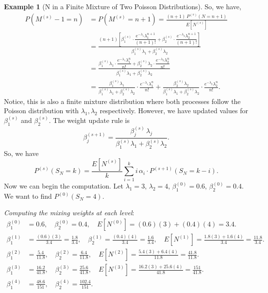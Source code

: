 \documentclass[11pt]{amsart}
\theoremstyle{definition}
\newtheorem{example}{Example}
\theoremstyle{plain}
\begin{document}
\begin{example}[N in a Finite Mixture of Two Poisson Distributions]
So, we have,
\begin{align*}
P(M^{(s)} - 1 = n)
    &= P(M^{(s)} = n + 1)
     = \frac{(n+1)\,P^{(s)}(N = n+1)}{E[N^{(s)}]} \\
    &= \frac{(n+1)\!\left[\beta_1^{(s)} \cdot \dfrac{e^{-\lambda_1}\lambda_1^{n+1}}{(n+1)!}
       + \beta_2^{(s)} \cdot \dfrac{e^{-\lambda_2}\lambda_2^{n+1}}{(n+1)!}\right]}
      {\beta_1^{(s)}\lambda_1 + \beta_2^{(s)}\lambda_2} \\
    &= \frac{\beta_1^{(s)}\lambda_1 \cdot \dfrac{e^{-\lambda_1}\lambda_1^n}{n!}
       + \beta_2^{(s)}\lambda_2 \cdot \dfrac{e^{-\lambda_2}\lambda_2^n}{n!}}
      {\beta_1^{(s)}\lambda_1 + \beta_2^{(s)}\lambda_2} \\
    &= \frac{\beta_1^{(s)}\lambda_1}{\beta_1^{(s)}\lambda_1 + \beta_2^{(s)}\lambda_2}
       \cdot \frac{e^{-\lambda_1}\lambda_1^n}{n!}
     + \frac{\beta_2^{(s)}\lambda_2}{\beta_1^{(s)}\lambda_1 + \beta_2^{(s)}\lambda_2}
       \cdot \frac{e^{-\lambda_2}\lambda_2^n}{n!}.
\end{align*}
Notice, this is also a finite mixture distribution where both processes follow the Poisson
distribution with $\lambda_1, \lambda_2$ respectively.  However, we have updated values for
$\beta_1^{(s)}$ and $\beta_2^{(s)}$.  The weight update rule is
\[
    \beta_j^{(s+1)}
    = \frac{\beta_j^{(s)}\,\lambda_j}{\beta_1^{(s)}\lambda_1 + \beta_2^{(s)}\lambda_2}.
\]
So, we have
\[
    P^{(s)}(S_N = k)
    = \frac{E[N^{(s)}]}{k} \sum_{i=1}^{k} i\,\alpha_i \cdot P^{(s+1)}(S_N = k - i).
\]
Now we can begin the computation.  Let $\lambda_1 = 3$, $\lambda_2 = 4$,
$\beta_1^{(0)} = 0.6$, $\beta_2^{(0)} = 0.4$.  We want to find $P^{(0)}(S_N = 4)$.

\medskip
\noindent\textit{Computing the mixing weights at each level}:
\begin{align*}
\beta_1^{(0)} &= 0.6, \quad \beta_2^{(0)} = 0.4, \quad
E[N^{(0)}] = (0.6)(3) + (0.4)(4) = 3.4. \\
\beta_1^{(1)} &= \frac{(0.6)(3)}{3.4} = \frac{1.8}{3.4}, \quad
\beta_2^{(1)} = \frac{(0.4)(4)}{3.4} = \frac{1.6}{3.4}, \quad
E[N^{(1)}] = \frac{1.8(3) + 1.6(4)}{3.4} = \frac{11.8}{3.4}. \\
\beta_1^{(2)} &= \frac{5.4}{11.8}, \quad \beta_2^{(2)} = \frac{6.4}{11.8}, \quad
E[N^{(2)}] = \frac{5.4(3) + 6.4(4)}{11.8} = \frac{41.8}{11.8}. \\
\beta_1^{(3)} &= \frac{16.2}{41.8}, \quad \beta_2^{(3)} = \frac{25.6}{41.8}, \quad
E[N^{(3)}] = \frac{16.2(3) + 25.6(4)}{41.8} = \frac{151}{41.8}. \\
\beta_1^{(4)} &= \frac{48.6}{151}, \quad \beta_2^{(4)} = \frac{102.4}{151}.
\end{align*}


\end{example}
\end{document}
